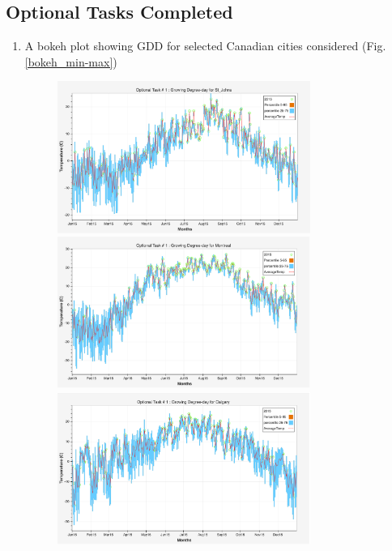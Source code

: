 \documentclass{article}
\begin{document}
\subsection{ \bf Optional Tasks Completed}
\begin{enumerate}
\item A bokeh plot showing GDD for selected Canadian cities considered (Fig. \ref{bokeh_min-max})
\begin{center}
\begin{figure}[!htb] 
\includegraphics[width=3.25in]{./source/Report/op-task-1_st_johns.png}\\

\includegraphics[width=3.25in]{./source/Report/op-task-1_montreal.png}\\

\includegraphics[width=3.25in]{./source/Report/op-task-1_calgary.png}\\


\end{figure}
\end{center}
\end{enumerate}
\end{document}
